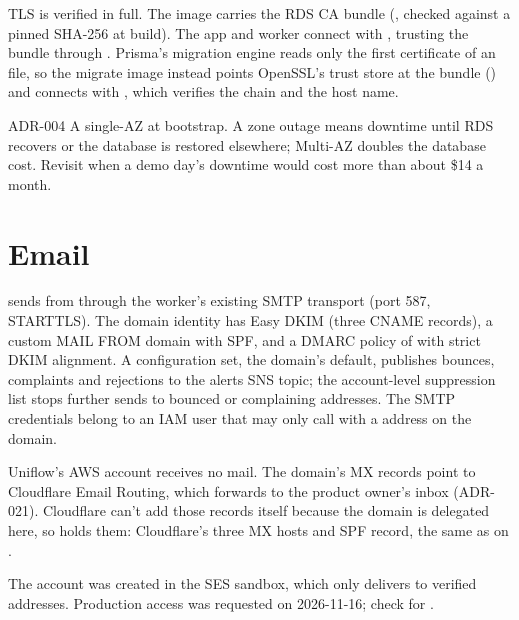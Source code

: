 TLS is verified in full. The image carries the RDS CA bundle (,
checked against a pinned SHA-256 at build). The app and worker connect with
, trusting the bundle through . Prisma's
migration engine reads only the first certificate of an  file, so the migrate image
instead points OpenSSL's trust store at the bundle () and connects with
, which verifies the chain and the host name.

\begin{decision}{ADR-004}
  A single-AZ  at bootstrap. A zone outage means downtime until RDS recovers
  or the database is restored elsewhere; Multi-AZ doubles the database cost. Revisit when a
  demo day's downtime would cost more than about \$14 a month.
\end{decision}

\section{Email}
 sends from  through the worker's existing
SMTP transport (port 587, STARTTLS). The domain identity has Easy DKIM (three CNAME records), a
custom MAIL FROM domain  with SPF, and a DMARC policy of
 with strict DKIM alignment. A configuration set, the domain's default,
publishes bounces, complaints and rejections to the alerts SNS topic; the account-level
suppression list stops further sends to bounced or complaining addresses. The SMTP credentials
belong to an IAM user that may only call  with a  address on the
domain.

Uniflow's AWS account receives no mail. The domain's MX records point to Cloudflare Email
Routing, which forwards  to the product owner's inbox (ADR-021). Cloudflare can't
add those records itself because the domain is delegated here, so 
holds them: Cloudflare's three MX hosts and SPF record, the same as on .

\begin{note}
  The account was created in the SES sandbox, which only delivers to verified addresses.
  Production access was requested on 2026-11-16; check  for
  .
\end{note}

